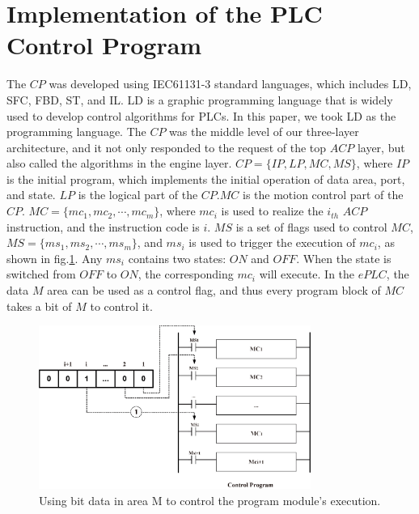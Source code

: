 \documentclass[journal]{IEEEtran}
\begin{document}
\section{Implementation of the PLC Control Program}
\label{PLC-Control-Program3}
The $CP$ was developed using  IEC61131-3 standard languages, which includes LD, SFC, FBD, ST, and IL. LD is a graphic programming language that is widely used to develop control algorithms for PLCs. In this paper, we took LD as the programming language. The $CP$ was the middle level of our three-layer architecture, and it not only responded to the request of the top $ACP$ layer, but also called the algorithms in the engine layer.
$CP=\{IP,LP,MC,MS\}$, where $IP$ is the initial program, which implements the initial operation of data area, port, and state. $LP$ is the logical part of the $CP$.$MC$ is the motion control part of the $CP$. $MC=\{mc_1,mc_2,\cdots,mc_m\}$, where $mc_i$ is used to realize the $i_{th}$ $ACP$ instruction, and the instruction code is $i$. $MS$ is a set of flags used to control $MC$, $MS=\{ms_1,ms_2,\cdots,ms_m\}$, and $ms_i$ is used to trigger the execution of $mc_i$, as shown in fig.\ref{fig:bitdatainM}. Any $ms_i$ contains two states: $ON$ and $OFF$. When the state is switched from $OFF$ to $ON$, the corresponding $mc_i$ will execute. In the $ePLC$, the data $M$ area can be used as a control flag, and thus every program block of $MC$ takes a bit of $M$ to control it.
\begin{figure}
\centering
\includegraphics[width=3.5in]{fig/FIG11_TII-18-0024.eps}
\caption{Using bit data in area M to control the program module's execution.}
\label{fig:bitdatainM}
\end{figure}
\end{document}
